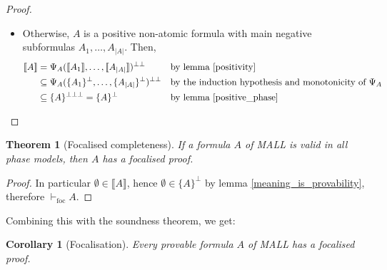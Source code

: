 \documentclass{article}
\newcommand\size[1]{{\lvert #1 \rvert}}
\newcommand\sem[1]{{\llbracket #1 \rrbracket}}
\newcommand\biperp{{\perp\perp}}
\newcommand\triperp{{\perp\perp\perp}}
\newcommand\vdashfoc{\vdash_\text{foc}}
\newtheorem{theorem}{Theorem}
\newtheorem{corollary}{Corollary}[theorem]
\begin{document}
\begin{proof}
\begin{itemize}
        \item Otherwise, $A$ is a positive non-atomic formula with main negative subformulas $A_1, \dots, A_\size{A}$.
        Then, \begin{align*}
            \sem{A} &= \Psi_A(\sem{A_1}, \dots, \sem{A_\size{A}})^\biperp &&\text{by lemma \ref{positivity}} \\
            &\subseteq \Psi_A(\{A_1\}^\perp, \dots, \{A_\size{A}\}^\perp)^\biperp &&\text{by the induction hypothesis and monotonicity of $\Psi_A$} \\
            &\subseteq \{A\}^\triperp = \{A\}^\perp &&\text{by lemma \ref{positive_phase}}
        \end{align*}
    \end{itemize}
\end{proof}

\begin{theorem}[Focalised completeness]
    If a formula $A$ of MALL is valid in all phase models, then $A$ has a focalised proof.
\end{theorem}
\begin{proof}
    In particular $\emptyset \in \sem{A}$, hence $\emptyset \in \{A\}^\perp$ by lemma \ref{meaning_is_provability}, therefore $\vdashfoc A$.
\end{proof}

Combining this with the soundness theorem, we get:
\begin{corollary}[Focalisation]
    Every provable formula $A$ of MALL has a focalised proof.
\end{corollary}

\printbibliography
\end{document}
